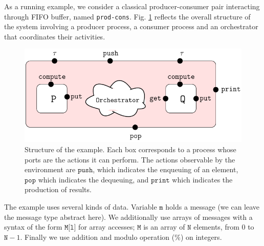 \documentclass[runningheads]{llncs}
\begin{document}
\begin{example}\label{Example:fifo-system} As a running example, we consider a classical producer-consumer pair  interacting through FIFO buffer, named \texttt{prod-cons}.  Fig. \ref{Fig:Architect} reflects the overall structure of the system involving a producer process, a consumer process and an orchestrator that coordinates  their activities. 

\begin{figure}[!ht]
 \centering
   \includegraphics[width=.70\textwidth]{Figures/Architecture.pdf}
   \caption{Structure of the example. Each box corresponds to a process whose ports are the actions it can perform. The  actions observable by the environment are $\texttt{push}$, which indicates the enqueuing of an element, $\texttt{pop}$ which indicates the dequeuing, and $\texttt{print}$ which indicates the production of results. \label{Fig:Architect}} 
\end{figure}

The example uses several kinds of data. Variable $\texttt{m}$ holds a message (we can leave the message type abstract here). We additionally use arrays of messages with a syntax of the form $\texttt{M[l]}$ for array accesses; $\texttt{M}$ is an array of $\texttt{N}$ elements, from $0$ to $\texttt{N}-1$. Finally we use addition and modulo operation ($\%$) on integers.


\end{example}
\end{document}
